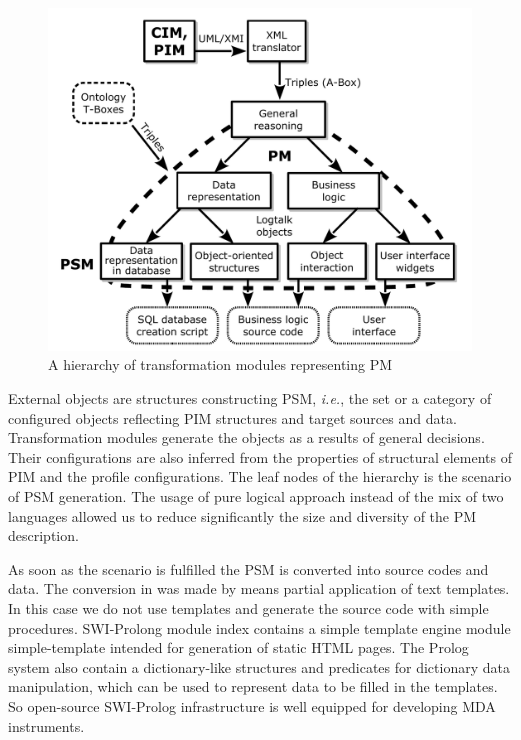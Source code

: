 \documentclass[conference,a4paper]{IEEEtran}
\begin{document}
\begin{figure}[t]
  \centering
  \includegraphics[width=1\linewidth]{architect_tree_pres-en-wo-OCL.pdf}
  \caption{A hierarchy of transformation modules representing PM}
  \label{fig:modules}
\end{figure}

External objects are structures constructing PSM, \emph{i.e.}, the set or a category of configured objects reflecting PIM structures and target sources and data.  Transformation modules generate the objects as a results of general decisions.  Their configurations are also inferred from the properties of structural elements of PIM and the profile configurations.  The leaf nodes of the hierarchy is the scenario of PSM generation.  The usage of pure logical approach instead of the mix of two languages allowed us to reduce significantly the size and diversity of the PM description.

As soon as the scenario is fulfilled the PSM is converted into source codes and data.  The conversion in \cite{tereh1} was made by means partial application of text templates.  In this case we do not use templates and generate the source code with simple procedures.  SWI-Prolong module index contains a simple template engine module simple-template intended for generation of static HTML pages.  The Prolog system also contain a dictionary-like structures and predicates for dictionary data manipulation, which can be used to represent data to be filled in the templates.  So open-source SWI-Prolog infrastructure is well equipped for developing MDA instruments.
\end{document}
